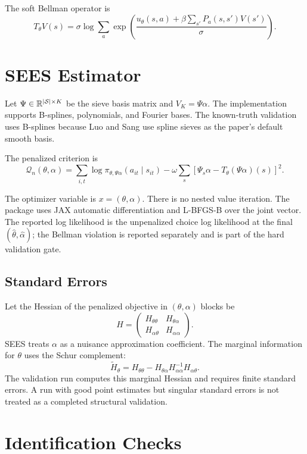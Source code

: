 \documentclass[10pt]{article}
\begin{document}
The soft Bellman operator is
\[
T_\theta V(s)
=
\sigma \log \sum_a
\exp\left(
\frac{u_\theta(s,a)+\beta\sum_{s'}P_a(s,s')V(s')}{\sigma}
\right).
\]

\section{SEES Estimator}

Let \(\Psi\in\mathbb R^{|\mathcal{S}|\times K}\) be the sieve basis matrix and
\(V_K=\Psi\alpha\). The implementation supports B-splines, polynomials, and
Fourier bases. The known-truth validation uses B-splines because Luo and Sang
use spline sieves as the paper's default smooth basis.

The penalized criterion is
\[
\mathcal Q_n(\theta,\alpha)
=
\sum_{i,t}\log \pi_{\theta,\Psi\alpha}(a_{it}\mid s_{it})
-
\omega
\sum_s
\left[
\Psi_s\alpha - T_\theta(\Psi\alpha)(s)
\right]^2.
\]

The optimizer variable is \(x=(\theta,\alpha)\). There is no nested value
iteration. The package uses JAX automatic differentiation and L-BFGS-B over
the joint vector. The reported log likelihood is the unpenalized choice log
likelihood at the final \((\hat\theta,\hat\alpha)\); the Bellman violation is
reported separately and is part of the hard validation gate.

\subsection{Standard Errors}

Let the Hessian of the penalized objective in \((\theta,\alpha)\) blocks be
\[
H =
\begin{pmatrix}
H_{\theta\theta} & H_{\theta\alpha}\\
H_{\alpha\theta} & H_{\alpha\alpha}
\end{pmatrix}.
\]
SEES treats \(\alpha\) as a nuisance approximation coefficient. The marginal
information for \(\theta\) uses the Schur complement:
\[
\tilde H_\theta
=
H_{\theta\theta}
-
H_{\theta\alpha}
H_{\alpha\alpha}^{-1}
H_{\alpha\theta}.
\]
The validation run computes this marginal Hessian and requires finite
standard errors. A run with good point estimates but singular standard errors
is not treated as a completed structural validation.

\section{Identification Checks}
\end{document}
